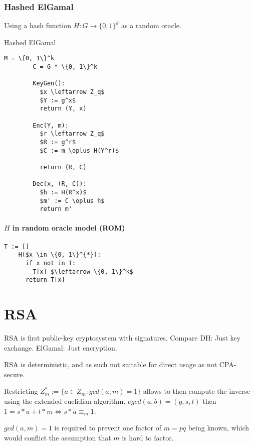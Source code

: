 \documentclass[a4paper]{scrreprt}
\begin{document}
\subsection{Hashed ElGamal}

Using a hash function $H: G \rightarrow \{0, 1\}^k$ as a random oracle.

\begin{library}{Hashed ElGamal}
	\begin{lstlisting}[mathescape=true,autogobble=true]
		M = \{0, 1\}^k
		C = G * \{0, 1\}^k

		KeyGen():
		  $x \leftarrow Z_q$
		  $Y := g^x$
		  return (Y, x)

		Enc(Y, m):
		  $r \leftarrow Z_q$
		  $R := g^r$
		  $C := m \oplus H(Y^r)$

		  return (R, C)

		Dec(x, (R, C)):
		  $h := H(R^x)$
		  $m' := C \oplus h$
		  return m'
	\end{lstlisting}
\end{library}

\subsubsection{$H$ in random oracle model (ROM)}

\begin{lstlisting}[mathescape=true,autogobble=true]
	T := []
	H($x \in \{0, 1\}^{*}):
	  if x not in T:
	    T[x] $\leftarrow \{0, 1\}^k$
	  return T[x]
\end{lstlisting}

\chapter{RSA}


RSA is first public-key cryptosystem with signatures. Compare DH: Just key
exchange. ElGamal: Just encryption.

RSA is deterministic, and as such not suitable for direct usage as not
CPA-secure.

Restricting $Z^{*}_m := \{a \in Z_m : gcd(a, m) = 1\}$ allows to then compute
the inverse using the extended euclidian algorithm. $egcd(a, b) = (g, s, t)$
then $1 = s*a + t*m \Leftrightarrow s * a \equiv_m 1$.

$gcd(a, m) = 1$ is required to prevent one factor of $m = pq$ being known,
which would conflict the assumption that $m$ is hard to factor.
\end{document}

